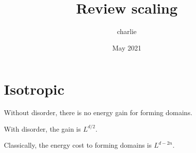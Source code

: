 \documentclass[12pt]{article}
\title{Review scaling}
\author{charlie}
\date{May 2021}
\begin{document}
\maketitle

\section{Isotropic}

\indent\indent Without disorder, there is no energy gain for forming domains.

With disorder, the gain is $L^{d/2}$.

Classically, the energy cost to forming domains is $L^{d-2n}$.



\end{document}
